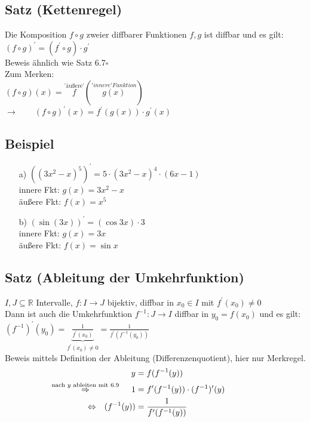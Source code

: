 \documentclass[12pt, titlepage]{article}
\newcommand{\R}{\mathds{R}}
\renewcommand{\>}{\rightarrow}
\renewcommand{\*}{\cdot}
\begin{document}
	\subsection{Satz (Kettenregel)}
	Die Komposition $f\circ g$ zweier diffbarer Funktionen $f,g$ ist diffbar und es gilt:\\
	$(f\circ g)^\prime=(f^\prime\circ g)\*g^\prime$\\
	Beweis ähnlich wie Satz 6.7\hfill$\square$\\
	Zum Merken:\\
	$(f\circ g)(x)=\overset{\textrm{'äußere'}}{f}(\overset{'innere' Funktion}{g(x)})$\\
	$\>\qquad (f\circ g)^\prime(x)=f^\prime(g(x))\*g^\prime(x)$
	\subsection{Beispiel}
	\begin{itemize}
		\item[a)] $((3x^2-x)^5)^\prime=5\*(3x^2-x)^4\*(6x-1)$\\
		innere Fkt: $g(x)=3x^2-x$\\
		äußere Fkt: $f(x)=x^5$
		\item[b)] $(\sin(3x))^\prime=(\cos 3x)\*3$\\
		innere Fkt: $g(x)=3x$\\
		äußere Fkt: $f(x)=\sin x$
	\end{itemize}
	\subsection{Satz (Ableitung der Umkehrfunktion)}
	$I, J\subseteq\R$ Intervalle, $f\colon I\>J$ bijektiv, diffbar in $x_0\in I$ mit $f^\prime(x_0)\neq0$\\
	Dann ist auch die Umkehrfunktion $f^{-1}\colon J\>I$ diffbar in $y_0=f(x_0)$ und es gilt:\\
	$(f^{-1})^\prime(y_0)=\underbrace{\frac{1}{f^\prime(x_0)}}_{f^\prime(x_0)\neq0}=\frac{1}{f^\prime(f^{-1}(y_0))}$\\
	Beweis mittels Definition der Ableitung (Differenzenquotient), hier nur Merkregel.
	\begin{align*}
		&&y&=f(f^{-1}(y))\\
		&\mathclap{\overset{\textrm{nach }y\textrm{ ableiten mit 6.9}}{\Rightarrow}}&1&=f^\prime(f^{-1}(y))\*(f^{-1})^\prime(y)\\
		&\Leftrightarrow&(f^{-1}(y))&=\frac{1}{f^\prime(f^{-1}(y))}
	\end{align*}
\end{document}

